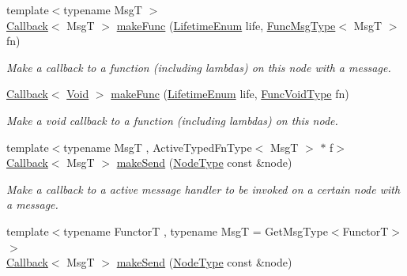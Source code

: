 \begin{DoxyCompactItemize}
{\footnotesize template$<$typename MsgT $>$ }\\\hyperlink{namespacevt_a36db99df4c973d48b1118a293fff533f}{Callback}$<$ MsgT $>$ \hyperlink{structvt_1_1pipe_1_1_pipe_manager_a85a3af6f11eae0f41d95a5f66433c0e7}{make\+Func} (\hyperlink{namespacevt_1_1pipe_acb42b284378c0fdac1d7c6335dc26f58}{Lifetime\+Enum} life, \hyperlink{structvt_1_1pipe_1_1_pipe_manager_base_aa54eee64ab32a27777a672d49eb861f4}{Func\+Msg\+Type}$<$ MsgT $>$ fn)
\begin{DoxyCompactList}\small\item\em Make a callback to a function (including lambdas) on this node with a message. \end{DoxyCompactList}\item 
\hyperlink{namespacevt_a36db99df4c973d48b1118a293fff533f}{Callback}$<$ \hyperlink{structvt_1_1pipe_1_1_pipe_manager_ab720c2580ecfd3ab36e49aeaaff64cc6}{Void} $>$ \hyperlink{structvt_1_1pipe_1_1_pipe_manager_aa4f7c8443d33d3453744b5459315f4ef}{make\+Func} (\hyperlink{namespacevt_1_1pipe_acb42b284378c0fdac1d7c6335dc26f58}{Lifetime\+Enum} life, \hyperlink{structvt_1_1pipe_1_1_pipe_manager_base_acd6f0c71f38f08d53f85e83b65406d77}{Func\+Void\+Type} fn)
\begin{DoxyCompactList}\small\item\em Make a void callback to a function (including lambdas) on this node. \end{DoxyCompactList}\item 
{\footnotesize template$<$typename MsgT , Active\+Typed\+Fn\+Type$<$ Msg\+T $>$ $\ast$ f$>$ }\\\hyperlink{namespacevt_a36db99df4c973d48b1118a293fff533f}{Callback}$<$ MsgT $>$ \hyperlink{structvt_1_1pipe_1_1_pipe_manager_a73583be6260418b13ee66e56cdade2da}{make\+Send} (\hyperlink{namespacevt_a866da9d0efc19c0a1ce79e9e492f47e2}{Node\+Type} const \&node)
\begin{DoxyCompactList}\small\item\em Make a callback to a active message handler to be invoked on a certain node with a message. \end{DoxyCompactList}\item 
{\footnotesize template$<$typename FunctorT , typename MsgT  = Get\+Msg\+Type$<$\+Functor\+T$>$$>$ }\\\hyperlink{namespacevt_a36db99df4c973d48b1118a293fff533f}{Callback}$<$ MsgT $>$ \hyperlink{structvt_1_1pipe_1_1_pipe_manager_a0fc60c66ec9c02e2c1874e08194cac44}{make\+Send} (\hyperlink{namespacevt_a866da9d0efc19c0a1ce79e9e492f47e2}{Node\+Type} const \&node)

\end{DoxyCompactItemize}
